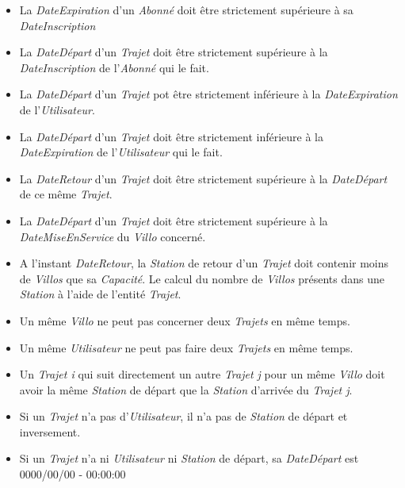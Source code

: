 \documentclass[a4paper, 12pt]{report}
\begin{document}
	\begin{itemize}
		\item La \textit{DateExpiration} d'un \textit{Abonné} doit être strictement supérieure à sa \textit{DateInscription}
		
		\item La \textit{DateDépart} d'un \textit{Trajet} doit être strictement supérieure à la \textit{DateInscription} de l'\textit{Abonné} qui le fait.
		
		\item La \textit{DateDépart} d'un \textit{Trajet} pot être strictement inférieure à la \textit{DateExpiration} de l'\textit{Utilisateur}.
		
		\item La \textit{DateDépart} d'un \textit{Trajet} doit être strictement inférieure à la \textit{DateExpiration} de l'\textit{Utilisateur} qui le fait.
		
		\item La \textit{DateRetour} d'un \textit{Trajet} doit être strictement supérieure à la \textit{DateDépart} de ce même \textit{Trajet}.
		
		\item La \textit{DateDépart} d'un \textit{Trajet} doit être strictement supérieure à la \textit{DateMiseEnService} du \textit{Villo} concerné.
		
		\item A l'instant \textit{DateRetour}, la \textit{Station} de retour d'un \textit{Trajet} doit contenir moins de \textit{Villos} que sa \textit{Capacité}. Le calcul du nombre de \textit{Villos} présents dans une \textit{Station} à l'aide de l'entité \textit{Trajet}.
		
		\item Un même \textit{Villo} ne peut pas concerner deux \textit{Trajets} en même temps.
		
		\item Un même \textit{Utilisateur} ne peut pas faire deux \textit{Trajets} en même temps.
		
		\item Un \textit{Trajet i} qui suit directement un autre \textit{Trajet j} pour un même \textit{Villo} doit avoir la même \textit{Station} de départ que la \textit{Station} d'arrivée du \textit{Trajet j}.
		
		\item Si un \textit{Trajet} n'a pas d'\textit{Utilisateur}, il n'a pas de \textit{Station} de départ et inversement.
		
		\item Si un \textit{Trajet} n'a ni \textit{Utilisateur} ni \textit{Station} de départ, sa \textit{DateDépart} est 0000/00/00 - 00:00:00
		

\end{itemize}
\end{document}
